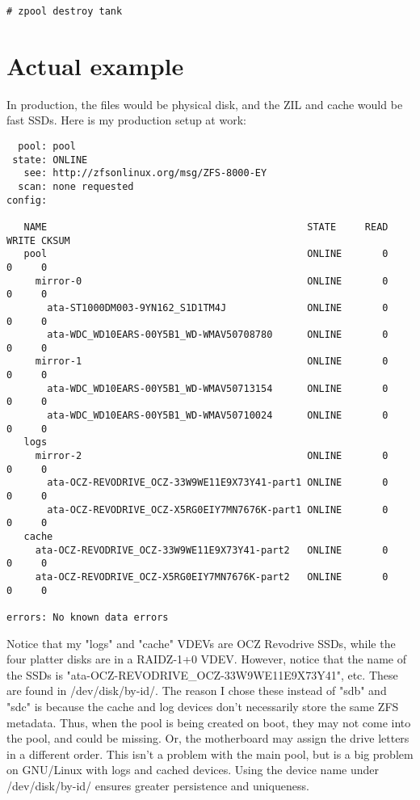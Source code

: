 \documentclass{book}
\begin{document}
\begin{lstlisting}
# zpool destroy tank
\end{lstlisting}

\section{Actual example}
In production, the files would be physical disk, and the ZIL and cache would be
fast SSDs. Here is my production setup at work:

\begin{lstlisting}
  pool: pool
 state: ONLINE
   see: http://zfsonlinux.org/msg/ZFS-8000-EY
  scan: none requested
config:

   NAME                                             STATE     READ WRITE CKSUM
   pool                                             ONLINE       0     0     0
     mirror-0                                       ONLINE       0     0     0
       ata-ST1000DM003-9YN162_S1D1TM4J              ONLINE       0     0     0
       ata-WDC_WD10EARS-00Y5B1_WD-WMAV50708780      ONLINE       0     0     0
     mirror-1                                       ONLINE       0     0     0
       ata-WDC_WD10EARS-00Y5B1_WD-WMAV50713154      ONLINE       0     0     0
       ata-WDC_WD10EARS-00Y5B1_WD-WMAV50710024      ONLINE       0     0     0
   logs
     mirror-2                                       ONLINE       0     0     0
       ata-OCZ-REVODRIVE_OCZ-33W9WE11E9X73Y41-part1 ONLINE       0     0     0
       ata-OCZ-REVODRIVE_OCZ-X5RG0EIY7MN7676K-part1 ONLINE       0     0     0
   cache
     ata-OCZ-REVODRIVE_OCZ-33W9WE11E9X73Y41-part2   ONLINE       0     0     0
     ata-OCZ-REVODRIVE_OCZ-X5RG0EIY7MN7676K-part2   ONLINE       0     0     0

errors: No known data errors
\end{lstlisting}

Notice that my "logs" and "cache" VDEVs are OCZ Revodrive SSDs, while the four
platter disks are in a RAIDZ-1+0 VDEV. However, notice that the name of the
SSDs is "ata-OCZ-REVODRIVE\_OCZ-33W9WE11E9X73Y41", etc. These are found in
/dev/disk/by-id/. The reason I chose these instead of "sdb" and "sdc" is
because the cache and log devices don't necessarily store the same ZFS
metadata. Thus, when the pool is being created on boot, they may not come into
the pool, and could be missing. Or, the motherboard may assign the drive
letters in a different order. This isn't a problem with the main pool, but is a
big problem on GNU/Linux with logs and cached devices. Using the device name
under /dev/disk/by-id/ ensures greater persistence and uniqueness.
\end{document}
